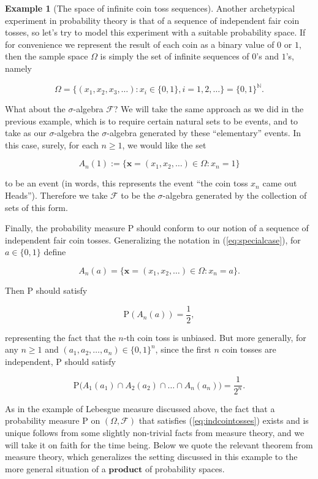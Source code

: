 \documentclass[11pt]{report}
\providecommand{\cal}{\mathcal}
\theoremstyle{plain}
\theoremstyle{definition}
\newtheorem{example}[thm]{Example}
\begin{document}
\begin{example}[The space of infinite coin toss sequences]
Another archetypical experiment in probability theory
is that of a sequence of independent fair coin tosses,
so let's try to model this experiment with a suitable
probability space. If for convenience we represent the
result of each coin as a binary value of $0$ or $1$,
then the sample space $\Omega$ is simply the set of
infinite sequences of $0$'s and $1$'s, namely

\[
\Omega = \big\{ (x_1, x_2, x_3, \ldots) : x_i \in \{0,1\}, i=1,2,\ldots \big\}
= \{ 0,1 \}^{\mathbb{N}}.
\]

What about the $\sigma$-algebra ${\cal F}$? We will
take the same approach as we did in the previous
example, which is to require certain natural sets to
be events, and to take as our $\sigma$-algebra the
$\sigma$-algebra generated by these ``elementary''
events. In this case, surely, for each $n\ge 1$, we
would like the set

\begin{equation*}
A_n(1) := \{ \mathbf{x}=(x_1,x_2,\ldots) \in \Omega : x_n = 1 \} \tag{12}\label{eq:specialcase}
\end{equation*}

to be an event (in words, this represents the event
``the coin toss $x_n$ came out Heads''). Therefore we
take ${\cal F}$ to be the $\sigma$-algebra generated
by the collection of sets of this form.

Finally, the probability measure $\mathrm{P}$ should
conform to our notion of a sequence of independent
fair coin tosses. Generalizing the notation in
(\ref{eq:specialcase}), for $a\in\{0,1\}$ define

\[
A_n(a) = \{ \mathbf{x}=(x_1,x_2,\ldots) \in \Omega : x_n = a \}.
\]

Then $\mathrm{P}$ should satisfy

\[
\mathrm{P}(A_n(a)) = \frac12,
\]

representing the fact that the $n$-th coin toss is
unbiased. But more generally, for any $n\ge 1$ and
$(a_1,a_2,\ldots,a_n) \in \{0,1\}^n$, since the first
$n$ coin tosses are independent, $\mathrm{P}$ should
satisfy

\begin{equation*} \tag{13}\label{eq:indcointosses}
\mathrm{P}\big(A_1(a_1) \cap A_2(a_2) \cap \ldots \cap A_n(a_n)\big) = \frac{1}{2^n}.
\end{equation*}

As in the example of Lebesgue measure discussed
above, the fact that a probability measure
$\mathrm{P}$  on $(\Omega, {\cal F})$ that satisfies
(\ref{eq:indcointosses}) exists and is unique follows from
some slightly non-trivial facts from measure theory,
and we will take it on faith for the time being. Below
we quote the relevant theorem from measure theory,
which generalizes the setting discussed in this
example to the more general situation of a
$\textbf{product}$ of probability spaces.
\end{example}
\end{document}
